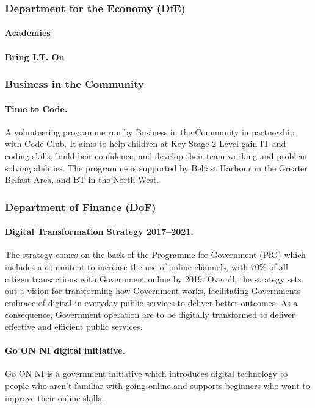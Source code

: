 \subsubsection{Department for the Economy (DfE)}

\paragraph{Academies}

\paragraph{Bring I.T. On}

\subsubsection{Business in the Community}

\paragraph{Time to Code.} A volunteering programme run by Business in the Community in partnership with Code Club. It aims to help children at Key Stage 2 Level gain IT and coding skills, build heir confidence, and develop their team working and problem solving abilities. The programme is supported by Belfast Harbour in the Greater Belfast Area, and BT in the North West.

\subsubsection{Department of Finance (DoF)}

\paragraph{Digital Transformation Strategy 2017--2021.} The strategy comes on the back of the Programme for Government (PfG) which includes a commitent to increase the use of online channels, with 70\% of all citizen transactions with Government online by 2019. Overall, the strategy sets out a vision for transforming how Government works, facilitating Governments embrace of digital in everyday public services to deliver better outcomes. As a consequence, Government operation are to be digitally transformed to deliver effective and efficient public services.

\paragraph{Go ON NI digital initiative.} Go ON NI is a government initiative which introduces digital technology to people who aren't familiar with going online and supports beginners who want to improve their online skills.

